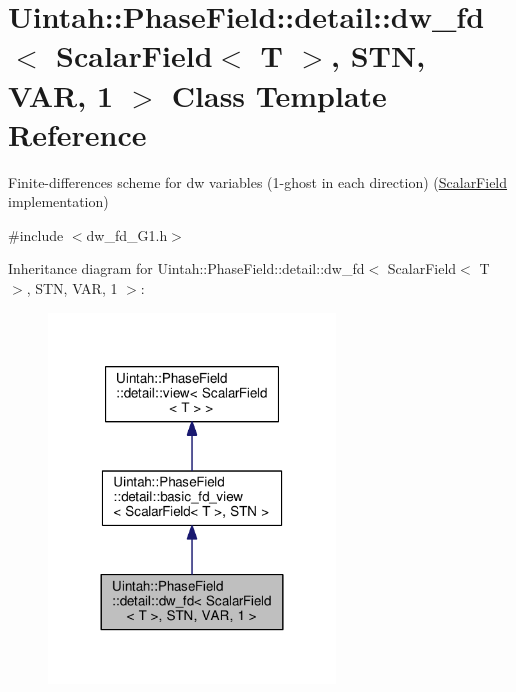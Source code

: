 \hypertarget{classUintah_1_1PhaseField_1_1detail_1_1dw__fd_3_01ScalarField_3_01T_01_4_00_01STN_00_01VAR_00_011_01_4}{}\section{Uintah\+:\+:Phase\+Field\+:\+:detail\+:\+:dw\+\_\+fd$<$ Scalar\+Field$<$ T $>$, S\+TN, V\+AR, 1 $>$ Class Template Reference}
\label{classUintah_1_1PhaseField_1_1detail_1_1dw__fd_3_01ScalarField_3_01T_01_4_00_01STN_00_01VAR_00_011_01_4}


Finite-\/differences scheme for dw variables (1-\/ghost in each direction) (\hyperlink{structUintah_1_1PhaseField_1_1ScalarField}{Scalar\+Field} implementation)  




{\ttfamily \#include $<$dw\+\_\+fd\+\_\+\+G1.\+h$>$}



Inheritance diagram for Uintah\+:\+:Phase\+Field\+:\+:detail\+:\+:dw\+\_\+fd$<$ Scalar\+Field$<$ T $>$, S\+TN, V\+AR, 1 $>$\+:\nopagebreak
\begin{figure}[H]
\begin{center}
\leavevmode
\includegraphics[width=216pt]{classUintah_1_1PhaseField_1_1detail_1_1dw__fd_3_01ScalarField_3_01T_01_4_00_01STN_00_01VAR_00_011_01_4__inherit__graph}
\end{center}
\end{figure}


